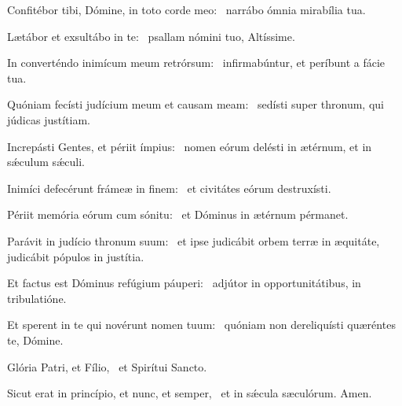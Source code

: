 \item Confitébor tibi, Dómine, in toto corde meo:~\psstar{} narrábo ómnia mirabília tua.
\item Lætábor et exsultábo in te:~\psstar{} psallam nómini tuo, Altíssime.
\item In converténdo inimícum meum retrórsum:~\psstar{} infirmabúntur, et períbunt a fácie tua.
\item Quóniam fecísti judícium meum et causam meam:~\psstar{} sedísti super thronum, qui júdicas justítiam.
\item Increpásti Gentes, et périit ímpius:~\psstar{} nomen eórum delésti in ætérnum, et in sǽculum sǽculi.
\item Inimíci defecérunt frámeæ in finem:~\psstar{} et civitátes eórum destruxísti.
\item Périit memória eórum cum sónitu:~\psstar{} et Dóminus in ætérnum pérmanet.
\item Parávit in judício thronum suum:~\psstar{} et ipse judicábit orbem terræ in æquitáte, judicábit pópulos in justítia.
\item Et factus est Dóminus refúgium páuperi:~\psstar{} adjútor in opportunitátibus, in tribulatióne.
\item Et sperent in te qui novérunt nomen tuum:~\psstar{} quóniam non dereliquísti quæréntes te, Dómine.
\item Glória Patri, et Fílio,~\psstar{} et Spirítui Sancto.
\item Sicut erat in princípio, et nunc, et semper,~\psstar{} et in sǽcula sæculórum. Amen.
